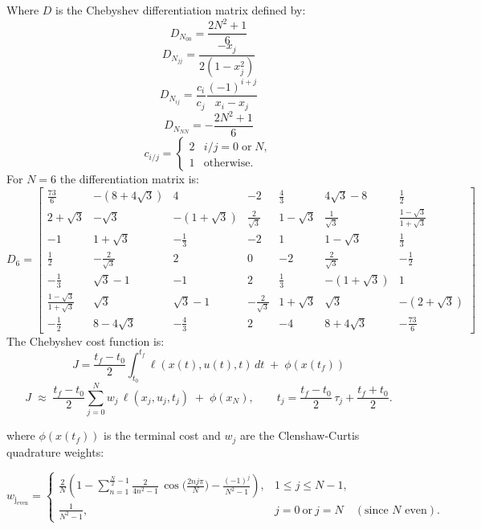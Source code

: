 \documentclass[]{article}
\begin{document}
Where $D$ is the Chebyshev differentiation matrix  defined by:
	\[
       D_{N_{00}}=\frac{2N^2+1}{6}
        \]
	\[
       D_{N_{jj}}=\frac{-x_j}{2(1-x_j^2)}
        \]
	\[
       D_{N_{ij}}=\frac{c_i}{c_j}\frac{(-1)^{i+j}}{x_i-x_j}
        \]
	\[
       D_{N_{NN}}=-\frac{2N^2+1}{6}
        \]
	\[
        c_{i/j}=
        \begin{cases}
        2 & i/j = 0 \;\text{or}\; N, \\
        1 & \text{otherwise}.
        \end{cases}
        \]
For $N=6$ the differentiation matrix is:
        \[
        D_{6} =
        \begin{bmatrix}
        \frac{73}{6} & -(8+4\sqrt{3})  & 4 & -2 & \frac{4}{3} & 4\sqrt{3} - 8 & \frac{1}{2}\\
        2+\sqrt{3} & -\sqrt{3} & -(1+\sqrt{3}) & \frac{2}{\sqrt{3}} & 1-\sqrt{3} & \frac{1}{\sqrt{3}} & \frac{1-\sqrt{3}}{1+\sqrt{3}}\\
        -1 & 1+\sqrt{3} & -\frac{1}{3} & -2 & 1 & 1-\sqrt{3} & \frac{1}{3}\\
        \frac{1}{2} & -\frac{2}{\sqrt{3}} & 2 & 0 & -2 & \frac{2}{\sqrt{3}} & -\frac{1}{2}\\
        -\frac{1}{3} & \sqrt{3}-1 & -1 & 2 & \frac{1}{3} & -(1+\sqrt{3}) & 1\\
        \frac{1-\sqrt{3}}{1+\sqrt{3}} & \sqrt{3} & \sqrt{3}-1 & -\frac{2}{\sqrt{3}} & 1+\sqrt{3} & \sqrt{3} &-( 2+\sqrt{3})\\
        -\frac{1}{2} & 8-4\sqrt{3} & -\frac{4}{3} & 2 & -4 & 8+4\sqrt{3} &  -\frac{73}{6}
        \end{bmatrix}
        \]
        The Chebyshev cost function is:
        	\[
	J=\frac{t_f-t_0}{2}\int_{t_0}^{t_f} \ell(x(t),u(t),t)\,dt \;+\; \phi(x(t_f))
        \]
        \[
        J \;\approx\; \frac{t_f-t_0}{2} \sum_{j=0}^{N} w_j \,\ell(x_j,u_j,t_j)
        \;+\; \phi(x_N),
        \qquad t_j = \frac{t_f-t_0}{2}\,\tau_j + \frac{t_f+t_0}{2}.
        \]
        	
        where $\phi(x(t_f))$ is the terminal cost and  $w_j$ are the Clenshaw-Curtis quadrature weights:

        \[
        w_{\mathrm{j_{even}}} =
        \begin{cases}
        \displaystyle
        \frac{2}{N}\!\left(
        1 - \sum_{n=1}^{\frac{N}{2}-1} \frac{2}{4n^{2}-1}\,
        \cos\!\Big(\tfrac{2 n j \pi}{N}\Big)
        -\frac{(-1)^{j}}{N^{2}-1}
        \right), & 1 \le j \le N-1, \\[2.0ex]
        \displaystyle \frac{1}{N^{2}-1}, & j=0\ \text{or}\ j=N \quad(\text{since \(N\) even}).
        \end{cases}
        \]
\end{document}
